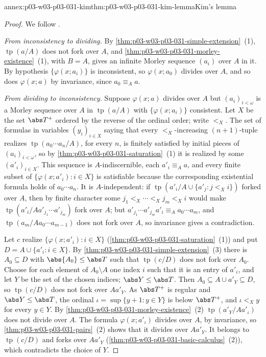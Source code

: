 \begin{annexitem}{annex:p03-w03-p03-031-kim}{thm:p03-w03-p03-031-kim-lemma}{Kim's lemma}
\begin{proof}
We follow \cite[Proposition~5.3, p.~272]{Casanovas2007Simplicity}.

\emph{From inconsistency to dividing.}  By
\cref{thm:p03-w03-p03-031-simple-extension}~(1),
\(\operatorname{tp}(a/A)\) does not fork over \(A\), and
\cref{thm:p03-w03-p03-031-morley-existence}~(1), with \(B=A\), gives an
infinite Morley sequence \((a_i)\) over \(A\) in it.  By hypothesis
\(\{\varphi(x;a_i)\}\) is inconsistent, so \(\varphi(x;a_0)\) divides over
\(A\), and so does \(\varphi(x;a)\) by invariance, since \(a_0\equiv_Aa\).

\emph{From dividing to inconsistency.}  Suppose \(\varphi(x;a)\) divides over
\(A\) but \((a_i)_{i<\omega}\) is a Morley sequence over \(A\) in
\(\operatorname{tp}(a/A)\) with \(\{\varphi(x;a_i)\}\) consistent.  Let
\(X\) be the set \(\abs T^+\) ordered by the reverse of the ordinal order;
write \(<_X\).  The set of formulas in variables \((y_i)_{i\in X}\) saying
that every \(<_X\)-increasing \((n+1)\)-tuple realizes
\(\operatorname{tp}(a_0\cdots a_n/A)\), for every \(n\), is finitely
satisfied by initial pieces of \((a_i)_{i<\omega}\), so by
\cref{thm:p03-w03-p03-031-saturation}~(1) it is realized by some
\((a'_i)_{i\in X}\).  This sequence is \(A\)-indiscernible, each
\(a'_i\equiv_Aa\), and every finite subset of
\(\{\varphi(x;a'_i):i\in X\}\) is satisfiable because the corresponding
existential formula holds of \(a_0\cdots a_n\).  It is \(A\)-independent:
if \(\operatorname{tp}(a'_i/A\cup\{a'_j:j<_Xi\})\) forked over \(A\), then
by finite character some \(j_1<_X\cdots<_Xj_m<_Xi\) would make
\(\operatorname{tp}(a'_i/Aa'_{j_1}\cdots a'_{j_m})\) fork over \(A\); but
\(a'_{j_1}\cdots a'_{j_m}a'_i\equiv_Aa_0\cdots a_m\), and
\(\operatorname{tp}(a_m/Aa_0\cdots a_{m-1})\) does not fork over \(A\), so
invariance gives a contradiction.

Let \(c\) realize \(\{\varphi(x;a'_i):i\in X\}\)
(\cref{thm:p03-w03-p03-031-saturation}~(1)) and put
\(D=A\cup\{a'_i:i\in X\}\).  By
\cref{thm:p03-w03-p03-031-simple-extension}~(3) there is \(A_0\subseteq D\)
with \(\abs{A_0}\leq\abs T\) such that \(\operatorname{tp}(c/D)\) does not
fork over \(A_0\).  Choose for each element of \(A_0\setminus A\) one index
\(i\) such that it is an entry of \(a'_i\), and let \(Y\) be the set of the
chosen indices; \(\abs Y\leq\abs T\).  Then
\(A_0\subseteq A\cup a'_Y\subseteq D\), so
\(\operatorname{tp}(c/D)\) does not fork over \(Aa'_Y\).  As \(\abs T^+\) is
regular and \(\abs Y\leq\abs T\), the ordinal
\(\iota=\sup\{y+1:y\in Y\}\) is below \(\abs T^+\), and \(\iota<_Xy\) for
every \(y\in Y\).  By \cref{thm:p03-w03-p03-031-morley-existence}~(2)
\(\operatorname{tp}(a'_Y/Aa'_\iota)\) does not divide over \(A\).  The
formula \(\varphi(x;a'_\iota)\) divides over \(A\), by invariance, so
\cref{thm:p03-w03-p03-031-pairs}~(2) shows that it divides over
\(Aa'_Y\).  It belongs to \(\operatorname{tp}(c/D)\) and forks over
\(Aa'_Y\) (\cref{thm:p03-w03-p03-031-basic-calculus}~(2)), which
contradicts the choice of \(Y\).
\end{proof}
\end{annexitem}

